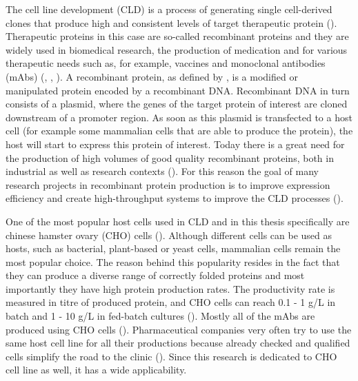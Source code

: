 The cell line development (CLD) is a process of generating single cell-derived clones that produce high and consistent levels of target therapeutic protein (\cite{lonza}). Therapeutic proteins in this case are so-called recombinant proteins and they are widely used in biomedical research, the production of medication and for various therapeutic needs such as, for example, vaccines and monoclonal antibodies (mAbs) (\cite{Ohtake_2013}, \cite{Jefferis_2017}, \cite{Funaro_1996}). A recombinant protein, as defined by \cite{Barbeau_2018}, is a modified or manipulated protein encoded by a recombinant DNA. Recombinant DNA in turn consists of a plasmid, where the genes of the target protein of interest are cloned downstream of a promoter region. As soon as this plasmid is transfected to a host cell (for example some mammalian cells that are able to produce the protein), the host will start to express this protein of interest. Today there is a great need for the production of high volumes of good quality recombinant proteins, both in industrial as well as research contexts (\cite{Tihanyi_2020}). For this reason the goal of many research projects in recombinant protein production is to improve expression efficiency and create high-throughput systems to improve the CLD processes (\cite{Tihanyi_2020}).



One of the most popular host cells used in CLD and in this thesis specifically are chinese hamster ovary (CHO) cells (\cite{Castan_2018}). Although different cells can be used as hosts, such as bacterial, plant-based or yeast cells, mammalian cells remain the most popular choice. The reason behind this popularity resides in the fact that they can produce a diverse range of correctly folded proteins and most importantly they have high protein production rates. The productivity rate is measured in titre of produced protein, and CHO cells can reach 0.1 - 1 g/L in batch and 1 - 10 g/L in fed-batch cultures (\cite{Tihanyi_2020}). Mostly all of the mAbs are produced using CHO cells (\cite{Lalonde_2017}). Pharmaceutical companies very often try to use the same host cell line for all their productions because already checked and qualified cells simplify the road to the clinic (\cite{Tihanyi_2020}). Since this research is dedicated to CHO cell line as well, it has a wide applicability.


